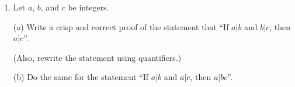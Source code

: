\documentclass[12pt]{article}
\begin{document}
\begin{enumerate}
\item Let $a$, $b$, and $c$ be integers.

  (a) Write a crisp and correct proof of the statement that ``If $a|b$ and $b|c$, then $a|c$''.

    \mbox{\qquad} (Also, rewrite the statement using quantifiers.)

  (b) Do the same for the statement ``If $a|b$ and $a|c$, then $a|bc$''.



  
\end{enumerate}
\end{document}
